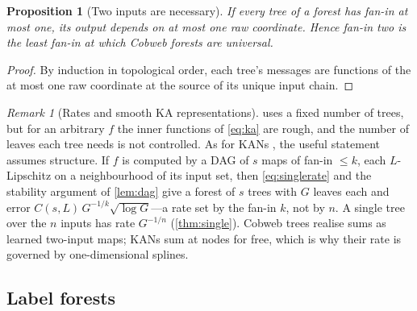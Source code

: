 \documentclass[11pt]{article}
\newtheorem{proposition}[theorem]{Proposition}
\theoremstyle{definition}
\theoremstyle{remark}
\newtheorem{remark}[theorem]{Remark}
\begin{document}
\begin{proposition}[Two inputs are necessary]\label{prop:fanin}
If every tree of a forest has fan-in at most one, its output depends on at most one raw
coordinate.  Hence fan-in two is the least fan-in at which Cobweb forests are universal.
\end{proposition}
\begin{proof}
By induction in topological order, each tree's messages are functions of the at most one
raw coordinate at the source of its unique input chain.
\end{proof}

\begin{remark}[Rates and smooth KA representations]\label{rem:rates}
 uses a fixed number of trees, but for an arbitrary $f$ the inner functions
of \eqref{eq:ka} are rough, and the number of leaves each tree needs is not controlled.
As for KANs \citep[Thm.~2.1]{liu2024kan}, the useful statement assumes structure.  If
$f$ is computed by a DAG of $s$ maps of fan-in $\le k$, each $L$-Lipschitz on a
neighbourhood of its input set, then \eqref{eq:singlerate} and the stability argument of
\cref{lem:dag} give a forest of $s$ trees with $G$ leaves each and error
$C(s,L)\,G^{-1/k}\sqrt{\log G}$---a rate set by the fan-in $k$, not by $n$.  A single
tree over the $n$ inputs has rate $G^{-1/n}$ (\cref{thm:single}).  Cobweb trees realise
sums as learned two-input maps; KANs sum at nodes for free, which is why their rate is
governed by one-dimensional splines.
\end{remark}

\subsection{Label forests}
\end{document}
